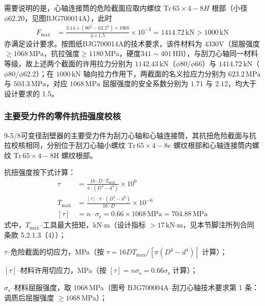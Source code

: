 需要说明的是，心轴连接筒的危险截面应取内螺纹 $\mathrm{Tr}\,65\times4-8H$ 根部（小径 $\phi 62.20$，见图BJG700014A），此时
\begin{equation}
    \begin{aligned}
    F_{\max} &= \frac{3.14 \times (80^2 - 62.2^2) \times 1068}{4 \times 1.5} \times 10^{-3}
             = 1414.72\,\mathrm{kN} > 1000\,\mathrm{kN}
    \end{aligned}
\end{equation}
亦满足设计要求。按图纸BJG700014A的技术要求，该件材料为 4330V（屈服强度$\ge 1068$\,MPa，抗拉强度$\ge 1180$\,MPa，硬度$341\sim401$\,HB），与刮刀心轴同一材料等级，故上述两个截面的许用拉力分别为 $1142.43\,\mathrm{kN}$（$\phi 80/\phi 66$）与 $1414.72\,\mathrm{kN}$（$\phi 80/\phi 62.2$）；在 $1000\,\mathrm{kN}$ 轴向拉力作用下，两截面的名义拉应力分别为 $623.2\,\mathrm{MPa}$ 与 $503.3\,\mathrm{MPa}$，对应 $1068\,\mathrm{MPa}$ 屈服强度的安全系数分别为 $1.71$ 与 $2.12$，均大于设计要求的 1.5。


\subsubsection{主要受力件的零件抗扭强度校核}

9-5/8\inch 可变径刮壁器的主要受力件为刮刀心轴和心轴连接筒，其抗扭危险截面与抗拉校核相同，分别位于刮刀心轴小螺纹 $\mathrm{Tr}\,65 \times 4-8e$ 螺纹根部和心轴连接筒内螺纹 $\mathrm{Tr}\,65 \times 4-8\mathrm{H}$ 螺纹根部。

抗扭强度按下式计算：
\begin{equation}
    \begin{aligned}
        \tau &= \frac{16 \cdot D \cdot T_{\max}}{\pi \cdot (D^4 - d^4)} \times 10^{6} \\
        T_{\max} &= \frac{[\tau] \cdot \pi \cdot (D^4 - d^4)}{16 \cdot D} \times 10^{-6} \\
        [\tau] &= n \cdot \sigma_{\mathrm{s}} = 0.66 \times 1068\,\mathrm{MPa} = 704.88\,\mathrm{MPa}
    \end{aligned}
\end{equation}
式中，$T_{\max}$--工具最大扭矩，kN$\cdot$m（设计指标 $>17$\,kN$\cdot$m，见本节脚注所列合同条款 5.2.1.3（4））；

$\tau$--危险截面的切应力，MPa（按 $\tau = 16DT_{\max}/[\pi(D^4-d^4)]$ 计算）；

$[\tau]$--材料许用切应力，MPa（按 $[\tau]=n\sigma_{\mathrm{s}} = 0.66\sigma_{\mathrm{s}}$ 计算）；

$\sigma_{\mathrm{s}}$--材料屈服强度，取 1068\,MPa（图号 BJG700004A--刮刀心轴技术要求第 1 条：调质后屈服强度 $\ge 1068$\,MPa）；

